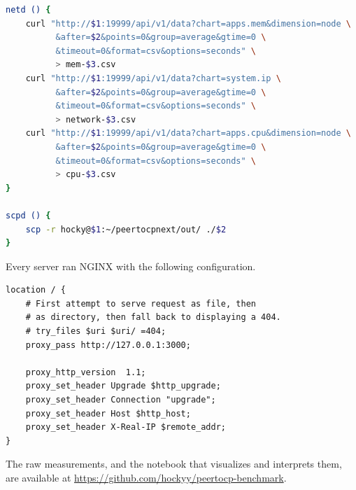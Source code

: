 \begin{lstlisting}[language=bash]
netd () {
    curl "http://$1:19999/api/v1/data?chart=apps.mem&dimension=node \
          &after=$2&points=0&group=average&gtime=0 \
          &timeout=0&format=csv&options=seconds" \
          > mem-$3.csv
    curl "http://$1:19999/api/v1/data?chart=system.ip \
          &after=$2&points=0&group=average&gtime=0 \
          &timeout=0&format=csv&options=seconds" \
          > network-$3.csv
    curl "http://$1:19999/api/v1/data?chart=apps.cpu&dimension=node \
          &after=$2&points=0&group=average&gtime=0 \
          &timeout=0&format=csv&options=seconds" \
          > cpu-$3.csv
}

scpd () {
    scp -r hocky@$1:~/peertocpnext/out/ ./$2
}
\end{lstlisting}

Every server ran NGINX with the following configuration.

\begin{lstlisting}
location / {
    # First attempt to serve request as file, then
    # as directory, then fall back to displaying a 404.
    # try_files $uri $uri/ =404;
    proxy_pass http://127.0.0.1:3000;

    proxy_http_version  1.1;
    proxy_set_header Upgrade $http_upgrade;
    proxy_set_header Connection "upgrade";
    proxy_set_header Host $http_host;
    proxy_set_header X-Real-IP $remote_addr;
}
\end{lstlisting}

The raw measurements, and the notebook that visualizes and interprets them, are available at \url{https://github.com/hockyy/peertocp-benchmark}.
